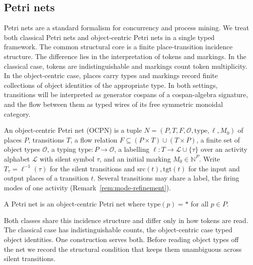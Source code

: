 \subsection{Petri nets}\label{sec:petri-nets}

Petri nets are a standard formalism for concurrency and process mining. We treat both classical Petri nets and object-centric Petri nets in a single typed framework. The common structural core is a finite place-transition incidence structure. The difference lies in the interpretation of tokens and markings. In the classical case, tokens are indistinguishable and markings count token multiplicity. In the object-centric case, places carry types and markings record finite collections of object identities of the appropriate type. In both settings, transitions will be interpreted as generator cospans of a cospan-algebra signature, and the flow between them as typed wires of its free symmetric monoidal category.

\begin{definition}
  An object-centric Petri net (OCPN) is a tuple $N=(P,T,F,\mathcal{O},\mathrm{type},\ell,M_0)$ of places $P$, transitions $T$, a flow relation $F\subseteq(P\times T)\cup(T\times P)$, a finite set of object types $\mathcal{O}$, a typing $\mathrm{type}:P\to\mathcal{O}$, a labelling $\ell:T\to\mathcal{L}\cup\{\tau\}$ over an activity alphabet $\mathcal{L}$ with silent symbol $\tau$, and an initial marking $M_0\in\mathbb{N}^{P}$. Write $T_\tau=\ell^{-1}(\tau)$ for the silent transitions and $\mathrm{src}(t),\mathrm{tgt}(t)$ for the input and output places of a transition $t$. Several transitions may share a label, the firing modes of one activity (Remark~\ref{rem:mode-refinement}).
\end{definition}

\begin{definition}
  A Petri net is an object-centric Petri net where $\mathrm{type}(p)=*$ for all $p\in{}P$.
\end{definition}

Both classes share this incidence structure and differ only in how tokens are read.
The classical case has indistinguishable counts, the object-centric case typed object
identities. One construction serves both. Before reading object types off the
net we record the structural condition that keeps them unambiguous across silent
transitions.

